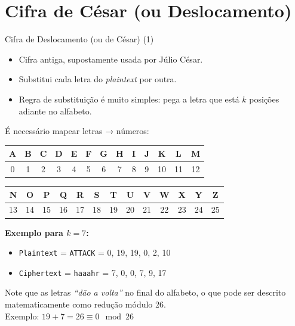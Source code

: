 \documentclass{beamer}
\begin{document}
\section{Cifra de César (ou Deslocamento)}
\begin{frame}{Cifra de Deslocamento (ou de César) (1)}
\begin{itemize}
    \item Cifra antiga, supostamente usada por Júlio César.
    \item Substitui cada letra do \textit{plaintext} por outra.
    \item Regra de substituição é muito simples: pega a letra que está $k$ posições adiante no alfabeto.
\end{itemize}

\vspace{0.5em}
É necessário mapear letras → números:

\begin{center}
\scriptsize
\begin{tabular}{|c|c|c|c|c|c|c|c|c|c|c|c|c|}
\hline
A & B & C & D & E & F & G & H & I & J & K & L & M \\
\hline
0 & 1 & 2 & 3 & 4 & 5 & 6 & 7 & 8 & 9 & 10 & 11 & 12 \\
\hline
\end{tabular}
\hspace{1em}
\begin{tabular}{|c|c|c|c|c|c|c|c|c|c|c|c|c|}
\hline
N & O & P & Q & R & S & T & U & V & W & X & Y & Z \\
\hline
13 & 14 & 15 & 16 & 17 & 18 & 19 & 20 & 21 & 22 & 23 & 24 & 25 \\
\hline
\end{tabular}
\end{center}

\vspace{1em}
\textbf{Exemplo para $k = 7$:}

\begin{itemize}
    \item \texttt{Plaintext} = \texttt{ATTACK} = 0, 19, 19, 0, 2, 10
    \item \texttt{Ciphertext} = \texttt{haaahr} = 7, 0, 0, 7, 9, 17
\end{itemize}

\vspace{0.5em}
Note que as letras \textit{“dão a volta”} no final do alfabeto, o que pode ser descrito matematicamente como redução módulo 26.\\
Exemplo: $19 + 7 = 26 \equiv 0 \mod 26$
\end{frame}
\end{document}
